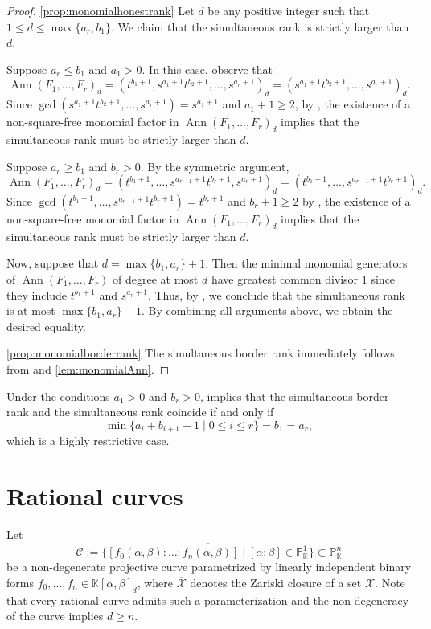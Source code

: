 \documentclass[a4paper, 11pt]{amsart}
\numberwithin{theorem}{section}
\theoremstyle{definition}
\numberwithin{equation}{section}
\DeclareMathOperator{\Ann}{\operatorname{Ann}}
\begin{document}
\begin{proof}\eqref{prop:monomialhonestrank} 
Let $d$ be any positive integer such that $1 \leq d \leq \max\{a_r, b_1\}$. 
We claim that the simultaneous rank is strictly larger than $d$.

Suppose $a_r \leq b_1$ and $a_1>0$. 
In this case, observe that 
\[
\Ann(F_1, \dots, F_r)_d = (t^{b_1+1},s^{a_1+1}t^{b_2+1},\dots,s^{a_r+1})_d = (s^{a_1+1}t^{b_2+1},\dots,s^{a_r+1})_d.
\]
Since $\gcd(s^{a_1+1}t^{b_2+1},\dots,s^{a_r+1}) = s^{a_1+1}$ and $a_1+1\geq 2$, by , the existence of a non-square-free monomial factor in $\Ann(F_1,\dots,F_r)_d$ implies that the simultaneous rank must be strictly larger than $d$.

Suppose $a_r \geq b_1$ and $b_r>0$. 
By the symmetric argument, 
\[
\Ann(F_1,\dots,F_r)_d = (t^{b_1+1}, \dots, s^{a_{r-1}+1}t^{b_r+1}, s^{a_r+1})_d = (t^{b_1+1},\dots,s^{a_{r-1}+1}t^{b_r+1})_d.
\]
Since $\gcd(t^{b_1+1},\dots,s^{a_{r-1}+1}t^{b_r+1}) = t^{b_r+1}$ and $b_r+1\geq 2$ by , the existence of a non-square-free monomial factor in $\Ann(F_1,\dots,F_r)_d$ implies that the simultaneous rank must be strictly larger than $d$.

Now, suppose that $d = \max\{b_1,a_r\}+1$.
Then the minimal monomial generators of $\Ann(F_1,\dots,F_r)$ of degree at most $d$ have greatest common divisor $1$ since they include $t^{b_1+1}$ and $s^{a_r+1}$.
Thus, by , we conclude that the simultaneous rank is at most $\max\{b_1,a_r\}+1$.
By combining all arguments above, we obtain the desired equality.

\eqref{prop:monomialborderrank} 
The simultaneous border rank immediately follows from  and  \eqref{lem:monomialAnn}.
\end{proof}
Under the conditions $a_1 > 0$ and $b_r > 0$,  implies that the simultaneous border rank and the simultaneous rank coincide if and only if 
\[
\min\{a_i+b_{i+1}+1 \mid 0\leq i \leq r\} = b_1 = a_r,
\]
which is a highly restrictive case.

\section{Rational curves}\label{sec:rationalCurves}

Let 
\[
\mathcal{C} := \overline{\{[f_0(\alpha,\beta) : \dots : f_n(\alpha,\beta)] \mid [\alpha:\beta] \in \mathbb{P}_{\mathbb{K}}^1\}} \subset \mathbb{P}_{\mathbb{K}}^n
\]
be a non-degenerate projective curve parametrized by linearly independent binary forms $f_0, \dots, f_n \in \mathbb{K}[\alpha,\beta]_d$, where $\overline{\mathcal{X}}$ denotes the Zariski closure of a set $\mathcal{X}$. 
Note that every rational curve admits such a parameterization and the non-degeneracy of the curve implies $d \geq n$.
\end{document}
